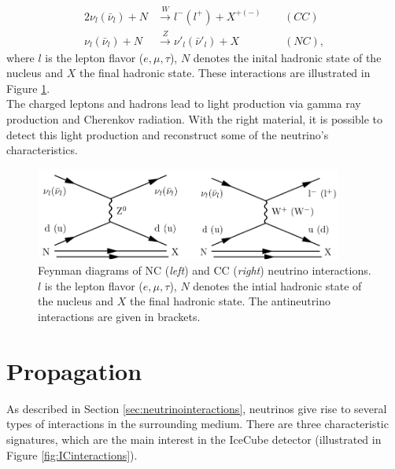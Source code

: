 \begin{alignat}{2}
\nu_l \left(\bar{\nu}_l\right) + N &\xrightarrow{W} l^- \left(l^+\right) + X^{+\left(-\right)} \ \ && \left(CC\right)\\
\nu_l \left(\bar{\nu}_l\right) + N &\xrightarrow{Z} \nu'_l \left(\bar{\nu}'_l\right) + X && \left(NC\right),
\end{alignat}
where $l$ is the lepton flavor ($e,\mu,\tau$), $N$ denotes the inital hadronic state of the nucleus and $X$ the final hadronic state. These interactions are illustrated in Figure \ref{fig:feynmanneutrino}.\\
\newline
The charged leptons and hadrons lead to light production via gamma ray production and Cherenkov radiation. With the right material, it is possible to detect this light production and reconstruct some of the neutrino's characteristics.

\begin{figure}[t]
\centering
\includegraphics[width = 0.9\textwidth]{chapter4/img/feynmanneutrino.png}
\caption{Feynman diagrams of NC (\textit{left}) and CC (\textit{right}) neutrino interactions. $l$ is the lepton flavor ($e,\mu,\tau$), $N$ denotes the intial hadronic state of the nucleus and $X$ the final hadronic state. The antineutrino interactions are given in brackets.}
\label{fig:feynmanneutrino}
\end{figure}


\section{Propagation}
\label{sec:propagation}
As described in Section \ref{sec:neutrinointeractions}, neutrinos give rise to several types of interactions in the surrounding medium. There are three characteristic signatures, which are the main interest in the IceCube detector (illustrated in Figure \ref{fig:ICinteractions}).


